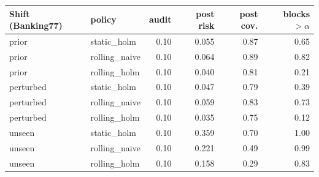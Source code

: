 \begin{tabular}{llrrrr}
\toprule
Shift (Banking77) & policy & audit & post risk & post cov. & blocks $>\alpha$\\
\midrule
prior & static\_holm & 0.10 & 0.055 & 0.87 & 0.65\\
prior & rolling\_naive & 0.10 & 0.064 & 0.89 & 0.82\\
prior & rolling\_holm & 0.10 & 0.040 & 0.81 & 0.21\\
perturbed & static\_holm & 0.10 & 0.047 & 0.79 & 0.39\\
perturbed & rolling\_naive & 0.10 & 0.059 & 0.83 & 0.73\\
perturbed & rolling\_holm & 0.10 & 0.035 & 0.75 & 0.12\\
unseen & static\_holm & 0.10 & 0.359 & 0.70 & 1.00\\
unseen & rolling\_naive & 0.10 & 0.221 & 0.49 & 0.99\\
unseen & rolling\_holm & 0.10 & 0.158 & 0.29 & 0.83\\
\bottomrule
\end{tabular}
